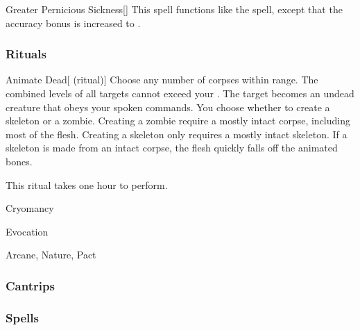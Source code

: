 \lowercase{\hypertarget{spell:Greater Pernicious Sickness}{}}\label{spell:Greater Pernicious Sickness}
\begin{freeability}[\nth{5}]{\hypertarget{spell:Greater Pernicious Sickness}{Greater Pernicious Sickness}}[]
This spell functions like the  spell, except that the accuracy bonus is increased to .
\end{freeability}
\vspace{0.25em}



\subsubsection{Rituals}


\lowercase{\hypertarget{spell:Animate Dead}{}}\label{spell:Animate Dead}
\begin{attuneability}[\nth{2}]{\hypertarget{spell:Animate Dead}{Animate Dead}}[ (ritual)]
Choose any number of corpses within \rngclose range.
The combined levels of all targets cannot exceed your .
The target becomes an undead creature that obeys your spoken commands.
You choose whether to create a skeleton or a zombie.
Creating a zombie require a mostly intact corpse, including most of the flesh.
Creating a skeleton only requires a mostly intact skeleton.
If a skeleton is made from an intact corpse, the flesh quickly falls off the animated bones.

This ritual takes one hour to perform.
\end{attuneability}
\vspace{0.25em}


\newpage
\begin{spellsection}{Cryomancy}

\begin{spellheader}
\end{spellheader}


 Evocation

 Arcane, Nature, Pact

\subsubsection{Cantrips}


\end{spellsection}


\subsubsection{Spells}


